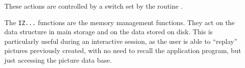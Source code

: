 These actions are controlled by a switch set by the routine .
 
The {\tt IZ...} functions are the memory management functions. They act on the
data structure in main storage and on the data stored on disk.
This is particularly useful during an interactive session, as the user is 
able to ``replay'' pictures previously created, with no need to recall the
application program, but just accessing the picture data base.
 
 
 

